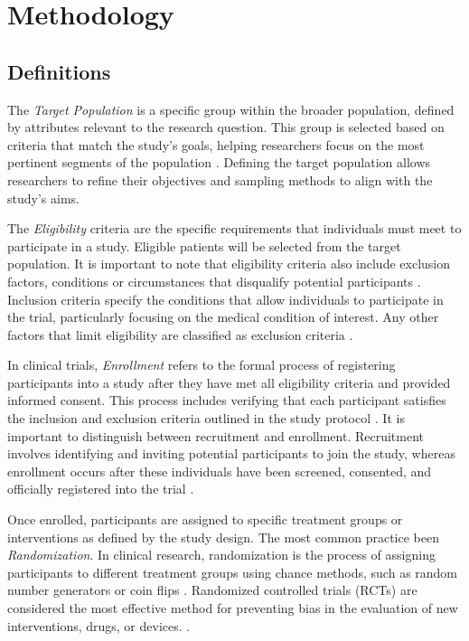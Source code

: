 

\chapter{Methodology} 

\section{Definitions}

The \textit{Target Population} is a specific group within the broader population, defined by attributes relevant to the research question. This group is selected based on criteria that match the study's goals, helping researchers focus on the most pertinent segments of the population \citep{willie2024population}. Defining the target population allows researchers to refine their objectives and sampling methods to align with the study's aims.


The \textit{Eligibility} criteria are the specific requirements that individuals must meet to participate in a study. Eligible patients will be selected from the target population. It is important to note that eligibility criteria also include exclusion factors, conditions or circumstances that disqualify potential participants \citep{food2018evaluating}. Inclusion criteria specify the conditions that allow individuals to participate in the trial, particularly focusing on the medical condition of interest. Any other factors that limit eligibility are classified as exclusion criteria \citep{van2007eligibility}.


In clinical trials, \textit{Enrollment} refers to the formal process of registering participants into a study after they have met all eligibility criteria and provided informed consent. This process includes verifying that each participant satisfies the inclusion and exclusion criteria outlined in the study protocol \citep{NIH2021}. It is important to distinguish between recruitment and enrollment. Recruitment involves identifying and inviting potential participants to join the study, whereas enrollment occurs after these individuals have been screened, consented, and officially registered into the trial \citep{frank2004current}. 

Once enrolled, participants are assigned to specific treatment groups or interventions as defined by the study design. The most common practice been \textit{Randomization}. In clinical research, randomization is the process of assigning participants to different treatment groups using chance methods, such as random number generators or coin flips \citep{lim2019randomization}. Randomized controlled trials (RCTs) are considered the most effective method for preventing bias in the evaluation of new interventions, drugs, or devices. \citep{van2007eligibility}.


